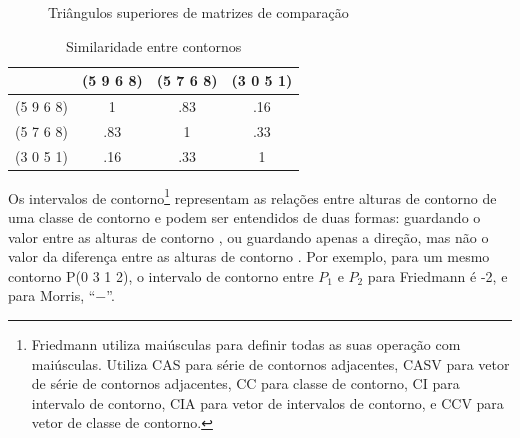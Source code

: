 \begin{figure}
  \qquad
  \qquad
  \caption{Triângulos superiores de matrizes de comparação}
  \label{fig:triangulos-com-matrix}
\end{figure}

\begin{table}
  \centering
    \begin{tabular}{c|ccc}
      & (5 9 6 8) & (5 7 6 8) & (3 0 5 1) \\
      \hline
      (5 9 6 8) & 1 & .83 & .16 \\
      (5 7 6 8) & .83 & 1 & .33 \\
      (3 0 5 1) & .16 & .33 & 1
    \end{tabular}
    \caption{Similaridade entre contornos}
  \label{tab:similaridade-contornos}
\end{table}

Os intervalos de contorno\footnote{Friedmann utiliza maiúsculas para
  definir todas as suas operação com maiúsculas. Utiliza CAS para
  série de contornos adjacentes, CASV para vetor de série de contornos
  adjacentes, CC para classe de contorno, CI para intervalo de
  contorno, CIA para vetor de intervalos de contorno, e CCV para vetor
  de classe de contorno.}  representam as relações entre alturas de
contorno de uma classe de contorno e podem ser entendidos de duas
formas: guardando o valor entre as alturas de contorno
\cite{friedmann85:methodology}, ou guardando apenas a direção, mas não
o valor da diferença entre as alturas de contorno
\cite{morris93:directions}. Por exemplo, para um mesmo contorno P(0 3
1 2), o intervalo de contorno entre $P_1$ e $P_2$ para Friedmann é -2,
e para Morris, ``$-$''.

